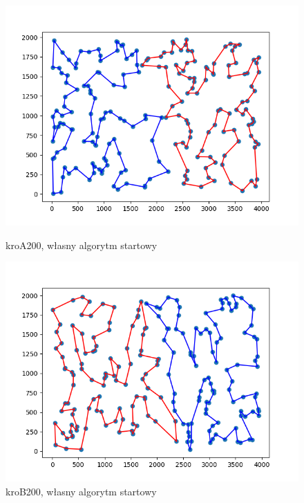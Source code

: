 \documentclass[11pt]{article}
\begin{document}
\begin{figure}[H]
    \vspace{0.5cm}

    \begin{minipage}[t]{0.45\textwidth}
        \centering
        \includegraphics[width=\linewidth]{best_paths/kroA200/traverse_steepest_shuffle/split_paths_regret_TSP}
        \caption{kroA200, własny algorytm startowy}
    \end{minipage}
    \hfill
    \begin{minipage}[t]{0.45\textwidth}
        \centering
        \includegraphics[width=\linewidth]{best_paths/kroB200/traverse_steepest_shuffle/split_paths_regret_TSP}
        \caption{kroB200, własny algorytm startowy}
    \end{minipage}
    \label{fig:minipage-steepest-vertex}
\end{figure}
\end{document}
